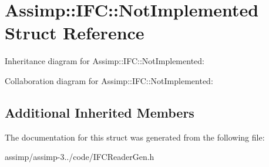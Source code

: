 \hypertarget{struct_assimp_1_1_i_f_c_1_1_not_implemented}{\section{Assimp\+:\+:I\+F\+C\+:\+:Not\+Implemented Struct Reference}
\label{struct_assimp_1_1_i_f_c_1_1_not_implemented}
}


Inheritance diagram for Assimp\+:\+:I\+F\+C\+:\+:Not\+Implemented\+:


Collaboration diagram for Assimp\+:\+:I\+F\+C\+:\+:Not\+Implemented\+:
\subsection*{Additional Inherited Members}


The documentation for this struct was generated from the following file\+:\begin{DoxyCompactItemize}
\item 
assimp/assimp-\/3../code/I\+F\+C\+Reader\+Gen.\+h\end{DoxyCompactItemize}

